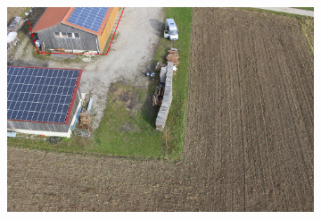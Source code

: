 \begin{figure}[H]
\begin{subfigure}[tbp]{0.31\columnwidth}
           \includegraphics[width=\textwidth]{optimize/IMG_0951_osm_ori.png}
           \caption[]{}%
           {{\small }}   
           \label{fig:5c}
       \end{subfigure}
       

\end{figure}
